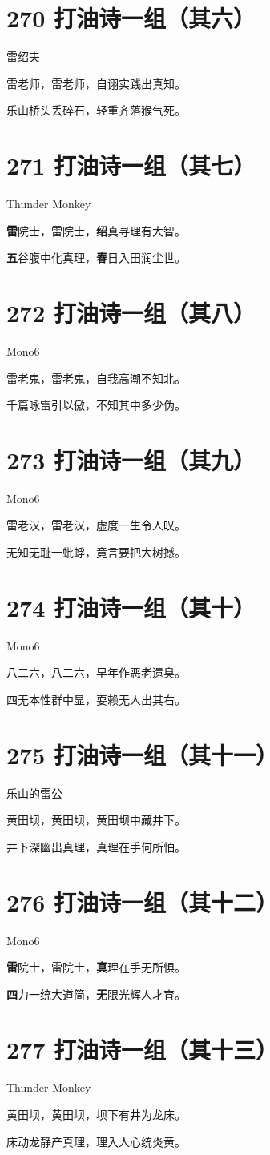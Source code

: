 \documentclass[UTF8,12pt,oneside]{ctexbook}
\def\pau#1{\begin{center} {#1} \end{center}} %
\def\poem#1#2{\section{#1}\pau{#2}} %
\begin{document}
        \poem{270 打油诗一组（其六）}{雷绍夫}
        \begin{center}
            雷老师，雷老师，自诩实践出真知。

            乐山桥头丢碎石，轻重齐落猴气死。
        \end{center}

        \poem{271 打油诗一组（其七）}{Thunder Monkey}
        \begin{center}
            \textbf{雷}院士，雷院士，\textbf{绍}真寻理有大智。
            
            \textbf{五}谷腹中化真理，\textbf{春}日入田润尘世。
        \end{center}

        \poem{272 打油诗一组（其八）}{Mono6}
        \begin{center}
            雷老鬼，雷老鬼，自我高潮不知北。
        
            千篇咏雷引以傲，不知其中多少伪。
        \end{center}

        \poem{273 打油诗一组（其九）}{Mono6}
        \begin{center}
            雷老汉，雷老汉，虚度一生令人叹。
            
            无知无耻一蚍蜉，竟言要把大树撼。
        \end{center}

        \poem{274 打油诗一组（其十）}{Mono6}
        \begin{center}
            八二六，八二六，早年作恶老遗臭。

            四无本性群中显，耍赖无人出其右。
        \end{center}

        \poem{275 打油诗一组（其十一）}{乐山的雷公}
        \begin{center}
            黄田坝，黄田坝，黄田坝中藏井下。

            井下深幽出真理，真理在手何所怕。
        \end{center}

        \poem{276 打油诗一组（其十二）}{Mono6}
        \begin{center}
            \textbf{雷}院士，雷院士，\textbf{真}理在手无所惧。
            
            \textbf{四}力一统大道简，\textbf{无}限光辉人才育。
        \end{center}

        \poem{277 打油诗一组（其十三）}{Thunder Monkey}
        \begin{center}
            黄田坝，黄田坝，坝下有井为龙床。
        
            床动龙静产真理，理入人心统炎黄。
        \end{center}
\end{document}
